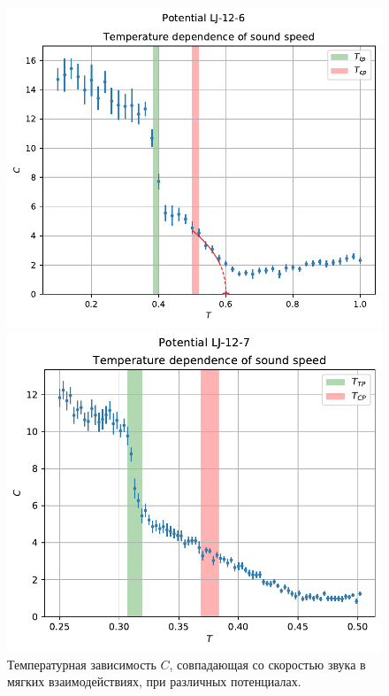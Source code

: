 \documentclass[pdf,hyperref={unicode}]{beamer}
\begin{document}
\begin{frame}
\begin{figure}[h]
\begin{center}
\begin{minipage}[h]{0.35\linewidth}
\includegraphics[width=\textwidth, keepaspectratio]{sound_speed_Potential LJ-12-6_1}
\end{minipage}
\begin{minipage}[h]{0.35\linewidth}
\includegraphics[width=\textwidth, keepaspectratio]{sound_speed_Potential LJ-12-7_1}
\end{minipage}
\caption{\tiny Температурная зависимость $C$, совпадающая со скоростью звука в мягких взаимодействиях, при различных потенциалах.}
\label{risC}
\end{center}
\end{figure}

\end{frame}
\end{document}
